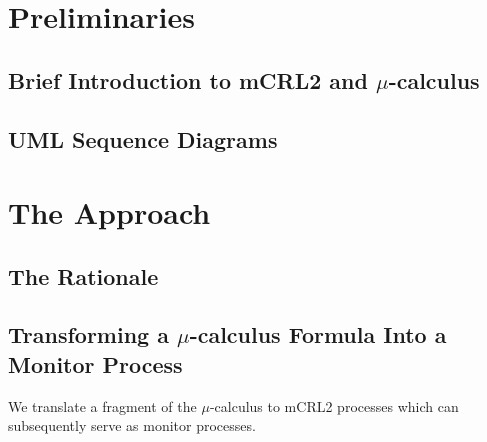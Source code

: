 \documentclass[letter]{llncs}
\begin{document}
\section{Preliminaries}
\label{sec:Preliminaries}

\subsection{Brief Introduction to mCRL2 and $\mu$-calculus}

\subsection{UML Sequence Diagrams}


\section{The Approach}
\label{sec:Approach}

\subsection{The Rationale}
\subsection{Transforming a $\mu$-calculus Formula Into a Monitor Process} 
We translate a fragment of the $\mu$-calculus to mCRL2 processes which
can subsequently serve as monitor processes.
\end{document}
